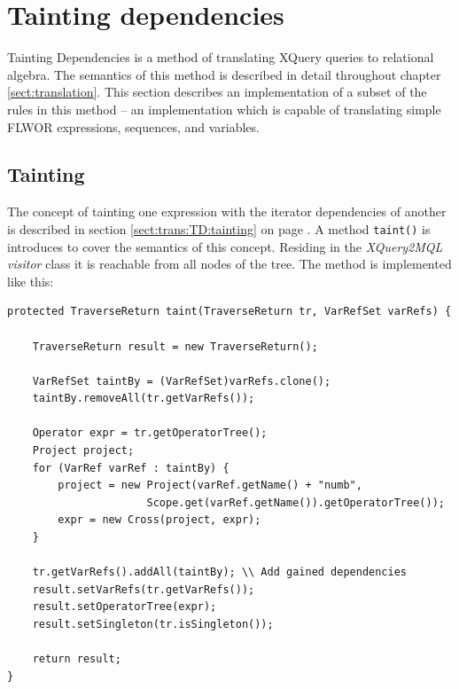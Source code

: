 \section{Tainting dependencies}
\label{sect:impl:tainting_deps}
Tainting Dependencies is a method of translating XQuery queries to
relational algebra. The semantics of this method is described in detail
throughout chapter \ref{sect:translation}. This section
describes an implementation of a subset of the rules in this method -- an
implementation which is capable of translating simple FLWOR expressions,
sequences, and variables.

\subsection{Tainting}
\label{sect:impl:taint:taint}
The concept of tainting one expression with the iterator dependencies of another is described in section
\ref{sect:trans:TD:tainting} on page \pageref{sect:trans:TD:tainting}. A method \texttt{taint()} is introduces to
cover the semantics of this concept. Residing in the \textit{XQuery2MQL visitor} class it is reachable from all
nodes of the tree. The method is implemented like this:

\begin{Verbatim}
protected TraverseReturn taint(TraverseReturn tr, VarRefSet varRefs) {
        
    TraverseReturn result = new TraverseReturn();
        
    VarRefSet taintBy = (VarRefSet)varRefs.clone();
    taintBy.removeAll(tr.getVarRefs());
        
    Operator expr = tr.getOperatorTree();
    Project project;
    for (VarRef varRef : taintBy) {
        project = new Project(varRef.getName() + "numb",
                      Scope.get(varRef.getName()).getOperatorTree());
        expr = new Cross(project, expr);
    }

    tr.getVarRefs().addAll(taintBy); \\ Add gained dependencies
    result.setVarRefs(tr.getVarRefs());
    result.setOperatorTree(expr);
    result.setSingleton(tr.isSingleton());
        
    return result;
}
\end{Verbatim}

